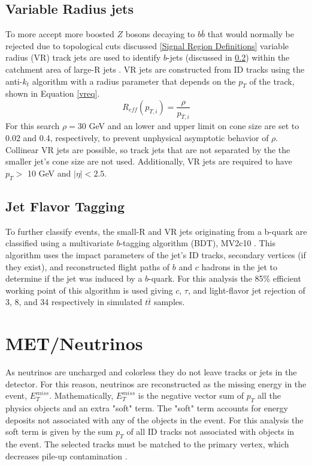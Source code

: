 \subsection{Variable Radius jets}
To more accept more boosted $Z$ bosons decaying to $b\bar{b}$ that would normally be rejected due to topological cuts discussed \ref{Signal Region Definitions} variable radius (VR) track jets are used to identify $b$-jets (discussed in \ref{Jet Flavor Tagging}) within the catchment area of large-R jets \cite{vrjets}. VR jets are constructed from ID tracks using the anti-$k_{t}$ algorithm with a radius parameter that depends on the $p_{T}$ of the track, shown in Equation \ref{vreq}.
\begin{equation}
R_{eff}(p_{T, i}) = \frac{\rho}{p_{T,i}}
\label{vreq}
\end{equation}
For this search $\rho=30$ GeV and an lower and upper limit on cone size are set to 0.02 and 0.4, respectively, to prevent unphysical asymptotic behavior of $\rho$. Collinear VR jets are possible, so track jets that are not separated by the the smaller jet's cone size are not used. Additionally, VR jets are required to have $p_{T} > $ 10 GeV and $|\eta| < 2.5$. 

\subsection{Jet Flavor Tagging}
\label{Jet Flavor Tagging}
To further classify events, the small-R and VR jets originating from a b-quark are classified using a multivariate $b$-tagging algorithm (BDT), MV2c10 \cite{atlas_btag}. This algorithm uses the impact parameters of the jet's ID tracks, secondary vertices (if they exist), and reconstructed flight paths of $b$ and $c$ hadrons in the jet to determine if the jet was induced by a $b$-quark. For this analysis the 85\% efficient working point of this algorithm is used giving $c$, $\tau$, and light-flavor jet rejection of 3, 8, and 34 respectively in simulated $t\bar{t}$ samples.

\section{MET/Neutrinos}
As neutrinos are uncharged and colorless they do not leave tracks or jets in the detector. For this reason, neutrinos are reconstructed as the missing energy in the event, $E_{T}^{miss}$. Mathematically, $E_{T}^{miss}$ is the negative vector sum of $p_{T}$ all the physics objects and an extra "soft" term. The "soft" term accounts for energy deposits not associated with any of the objects in the event. For this analysis the soft term is given by the sum $p_{T}$ of all ID tracks not associated with objects in the event. The selected tracks must be matched to the primary vertex, which decreases pile-up contamination \cite{met_preformance}. 

